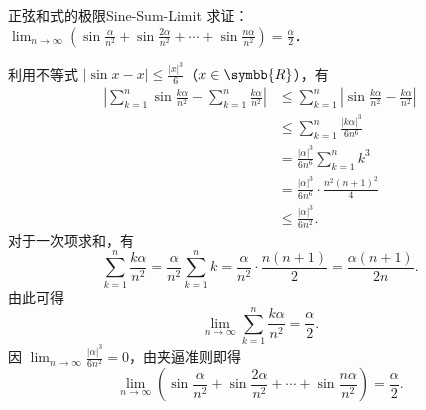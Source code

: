 \begin{problem}{正弦和式的极限}{Sine-Sum-Limit}
    求证：$\lim_{n\to\infty} \left( \sin \frac{\alpha}{n^2} + \sin \frac{2\alpha}{n^2} + \cdots + \sin \frac{n\alpha}{n^2} \right) = \frac{\alpha}{2}$．
\end{problem}

\begin{myproof}
    利用不等式 $|\sin x - x| \leqslant \frac{|x|^3}{6}$（$x \in \symbb{R}$），有
    \begin{equation}
        \begin{aligned}
            \left| \sum_{k=1}^n \sin \frac{k\alpha}{n^2} - \sum_{k=1}^n \frac{k\alpha}{n^2} \right| & \leqslant \sum_{k=1}^n \left| \sin \frac{k\alpha}{n^2} - \frac{k\alpha}{n^2} \right| \\
                                                                                                    & \leqslant \sum_{k=1}^n \frac{|k\alpha|^3}{6n^6}                                      \\
                                                                                                    & = \frac{|\alpha|^3}{6n^6} \sum_{k=1}^n k^3                                           \\
                                                                                                    & = \frac{|\alpha|^3}{6n^6} \cdot \frac{n^2(n+1)^2}{4}                                 \\
                                                                                                    & \leqslant \frac{|\alpha|^3}{6n^2}.
        \end{aligned}
    \end{equation}
    对于一次项求和，有
    \begin{equation}
        \sum_{k=1}^n \frac{k\alpha}{n^2} = \frac{\alpha}{n^2} \sum_{k=1}^n k = \frac{\alpha}{n^2} \cdot \frac{n(n+1)}{2} = \frac{\alpha(n+1)}{2n}.
    \end{equation}
    由此可得
    \begin{equation}
        \lim_{n\to\infty} \sum_{k=1}^n \frac{k\alpha}{n^2} = \frac{\alpha}{2}.
    \end{equation}
    因 $\lim_{n\to\infty} \frac{|\alpha|^3}{6n^2} = 0$，由夹逼准则即得
    \begin{equation}
        \lim_{n\to\infty} \left( \sin \frac{\alpha}{n^2} + \sin \frac{2\alpha}{n^2} + \cdots + \sin \frac{n\alpha}{n^2} \right) = \frac{\alpha}{2}.
    \end{equation}
\end{myproof}

